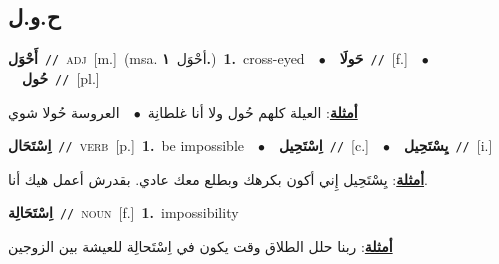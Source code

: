 \documentclass[10pt,a4paper,twoside]{article} %
\begin{document}
\begin{multicols}{2}
\vspace{-3mm}
\subsection*{\color{blue}\foreignlanguage{arabic}{ح.و.ل}\color{blue}{}} 

{\setlength\topsep{0pt}\textbf{\foreignlanguage{arabic}{أَحْوَل}}\ {\color{gray}\texttt{//}\color{black}}\ \textsc{adj}\ [m.]\ \color{gray}(msa. \foreignlanguage{arabic}{أحْوَل}~\foreignlanguage{arabic}{\textbf{١.}})\color{black}\ \textbf{1.}~cross-eyed\ \ $\bullet$\ \ \setlength\topsep{0pt}\textbf{\foreignlanguage{arabic}{حَولَا}}\ {\color{gray}\texttt{//}\color{black}}\ [f.]\ \ $\bullet$\ \ \setlength\topsep{0pt}\textbf{\foreignlanguage{arabic}{حُول}}\ {\color{gray}\texttt{//}\color{black}}\ [pl.]\  \begin{flushright}\color{gray}\foreignlanguage{arabic}{\textbf{\underline{\foreignlanguage{arabic}{أمثلة}}}: العيلة كلهم حُول ولا أنا غلطانِة\ $\bullet$\ \  العروسة حُولا شوي}\end{flushright}\color{black}} \vspace{2mm}

{\setlength\topsep{0pt}\textbf{\foreignlanguage{arabic}{اِسْتَحَال}}\ {\color{gray}\texttt{//}\color{black}}\ \textsc{verb}\ [p.]\ \textbf{1.}~be impossible\ \ $\bullet$\ \ \setlength\topsep{0pt}\textbf{\foreignlanguage{arabic}{اِسْتَحِيل}}\ {\color{gray}\texttt{//}\color{black}}\ [c.]\ \ $\bullet$\ \ \setlength\topsep{0pt}\textbf{\foreignlanguage{arabic}{يِسْتَحِيل}}\ {\color{gray}\texttt{//}\color{black}}\ [i.]\  \begin{flushright}\color{gray}\foreignlanguage{arabic}{\textbf{\underline{\foreignlanguage{arabic}{أمثلة}}}: يِسْتَحِيل إِني أكون بكرهك وبطلع معك عادي. بقدرش أعمل هيك أنا.}\end{flushright}\color{black}} \vspace{2mm}

{\setlength\topsep{0pt}\textbf{\foreignlanguage{arabic}{اِسْتَحَالِة}}\ {\color{gray}\texttt{//}\color{black}}\ \textsc{noun}\ [f.]\ \textbf{1.}~impossibility\  \begin{flushright}\color{gray}\foreignlanguage{arabic}{\textbf{\underline{\foreignlanguage{arabic}{أمثلة}}}: ربنا حلل الطلاق وقت يكون في اِسْتَحالِة للعيشة بين الزوجين}\end{flushright}\color{black}} \vspace{2mm}


\end{multicols}
\end{document}
